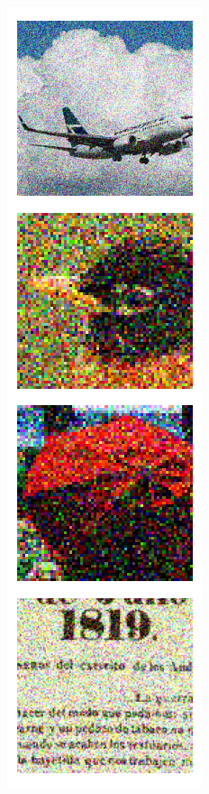 \documentclass{article} %
\begin{document}
\begin{figure}[h]
\begin{subfigure}[t]{0.16\columnwidth}
\end{subfigure}
\begin{subfigure}[t]{0.16\columnwidth}
\includegraphics[width=1\columnwidth]{figures/latents/noise64.png}\caption{}

\end{subfigure}
\end{figure}
\end{document}
